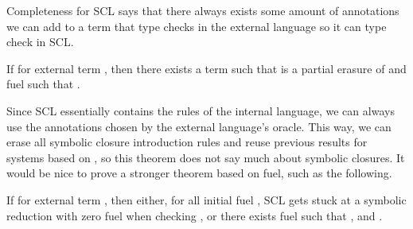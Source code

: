 


Completeness for SCL says that there always exists some amount of annotations
we can add to a term that type checks in the external language so it can type
check in SCL.

\begin{conjecture}
  If \ltitjudgementNoElab{}
                     {\ltiE{}}
                     {\ltiT{}}
                     for external term {\ltiE{}},
                     then
    there exists a term \ltiF{} such that \ltiE{} is a partial erasure of \ltiF{}
    and fuel \ltiFuel{}
    such that
    \ltitSstkjudgementNoElab{\ltimakeCombinedThreadedEnv{\ltiFuel{}}{\ltiEmptyClosureCache}}
                      {\ltiEmptyEnv}
                      {\ltiF{}}
                      {\ltiT{}}
                      {\ltimakeCombinedThreadedEnv{\ltiFuelp{}}{\ltiClosureCache{}}}
                      {\ltiFp{}}.
\end{conjecture}

Since SCL essentially contains the rules of the internal language, we can always
use the annotations chosen by the external language's oracle. This way, we can
erase all symbolic closure introduction rules and reuse previous results for systems
based on \ltiFsub, so this theorem does not say much about symbolic closures.
It would be nice to prove a stronger theorem
based on fuel, such as the following.

\begin{conjecture}
  If \ltitjudgementNoElab{}
                     {\ltiE{}}
                     {\ltiT{}}
                     for external term {\ltiE{}},
                     then
    either, for all initial fuel \ltiFuel{}, SCL gets stuck at a symbolic reduction with zero fuel when checking {\ltiE{}},
    or there exists fuel \ltiFuel{}
    such that
    \ltitSstkjudgementNoElab{\ltimakeCombinedThreadedEnv{\ltiFuel{}}{\ltiEmptyClosureCache}}
                      {\ltiEmptyEnv}
                      {\ltiE{}}
                      {\ltiTp{}}
                      {\ltimakeCombinedThreadedEnv{\ltiFuelp{}}{\ltiClosureCache{}}}
                      {\ltiFp{}},
          and \ltiisubtype{\ltiEnv{}}{\ltielimClosTLHS{\varnothing}{\ltiClosureCache{}}{\ltiTp{}}}{\ltiT{}}.
\end{conjecture}

